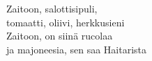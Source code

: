 
Zaitoon, salottisipuli, \\ 
tomaatti, oliivi, herkkusieni
\\
Zaitoon, on siinä rucolaa
\\ ja majoneesia, sen saa Haitarista
